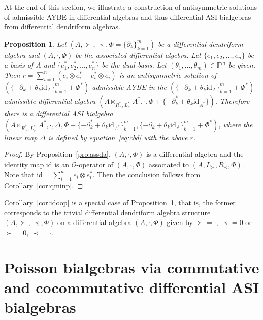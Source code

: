 \documentclass[10pt,a4paper]{amsart}
\numberwithin{equation}{section}
\newtheorem{Proposition}[Theorem]{Proposition}
{ \theoremstyle{definition}
	\newtheorem{Definition}[Theorem]{Definition}
	\newtheorem{Note}[Theorem]{Note}
	\newtheorem{Example}[Theorem]{Example}
	\newtheorem{Remark}[Theorem]{Remark} }
\newcommand{\id}{\mathrm{id}}
\begin{document}
At the end of this section, we illustrate a construction of
antisymmetric solutions of admissible AYBE in differential
algebras and thus differential ASI bialgebras from differential
dendriform algebras.

\begin{Proposition}\label{pro:denddasi}
 Let $(A, \succ, \prec, \Phi = \{\partial_k\}_{k=1}^m)$ be a differential dendriform algebra and $(A, \cdot, \Phi)$ be the associated differential algebra.
 Let $\{e_1, e_2, \dots, e_n\}$ be a basis of $A$ and $\{e_1^*, e_2^*, \dots, e_n^*\}$ be the dual basis.
 Let $(\theta_1, \dots, \theta_m) \in \mathbb{F}^m$ be given.
 Then $r = \sum_{i=1}^n (e_i \otimes e_i^* - e_i^* \otimes e_i)$ is an antisymmetric solution of
 $(\{-\partial_k + \theta_k \id_A\}_{k=1}^m + \Phi^*)$-admissible AYBE in the
 $(\{-\partial_k + \theta_k \id_A\}_{k=1}^m + \Phi^*)$-admissible differential algebra
 $(A \ltimes_{R^*_{\prec}, L^*_{\succ}}A^*, \cdot, \Phi + \{-\partial_k^* + \theta_k \id_{A^*}\})$.
 Therefore there is a differential ASI bialgebra
 $(A \ltimes_{R^*_{\prec}, L^*_{\succ}}A^*, \cdot, \Delta, \Phi + \{-\partial_k^* + \theta_k \id_{A^*}\}_{k=1}^m, \{-\partial_k + \theta_k \id_A\}_{k=1}^m + \Phi^*)$,
 where the linear map $\Delta$ is defined by equation~\eqref{eq:cbd} with the above $r$.
\end{Proposition}
\begin{proof}
 By Proposition~\ref{pro:assda}, $(A, \cdot, \Phi)$ is a differential algebra and the identity map $\id$ is an $\mathcal{O}$-operator of $(A, \cdot, \Phi)$ associated to $(A,L_\succ, R_\prec, \Phi)$.
 Note that $\id = \sum^n_{i=1} e_i\otimes e_i^*$.
 Then the conclusion follows from Corollary~\ref{cor:qminp}.
\end{proof}

\begin{Remark}Corollary~\ref{cor:idoop} is a special case of Proposition~\ref{pro:denddasi},
 that is, the former corresponds to the trivial differential dendriform algebra structure
 $(A, \succ, \prec, \Phi)$ on a differential algebra $(A, \cdot, \Phi)$ given by $\succ = \cdot$, $\prec = 0$ or $\succ = 0$, $\prec = \cdot$.
\end{Remark}

\section[Poisson bialgebras via commutative and cocommutative differential ASI bialgebras]{Poisson bialgebras via commutative\\ and cocommutative differential ASI bialgebras}\label{sec:poisson}
\end{document}
